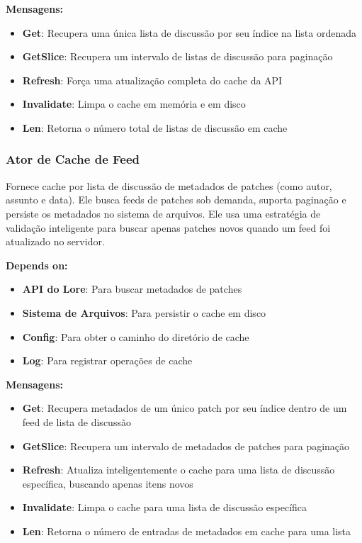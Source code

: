 \textbf{Mensagens:}

\begin{itemize}
    \item \textbf{Get}: Recupera uma única lista de discussão por seu índice na lista ordenada
    \item \textbf{GetSlice}: Recupera um intervalo de listas de discussão para paginação
    \item \textbf{Refresh}: Força uma atualização completa do cache da API
    \item \textbf{Invalidate}: Limpa o cache em memória e em disco
    \item \textbf{Len}: Retorna o número total de listas de discussão em cache
\end{itemize}

\subsubsection{Ator de Cache de Feed}

Fornece cache por lista de discussão de metadados de patches (como autor, assunto e data). Ele busca feeds de patches sob demanda, suporta paginação e persiste os metadados no sistema de arquivos. Ele usa uma estratégia de validação inteligente para buscar apenas patches novos quando um feed foi atualizado no servidor.

\textbf{Depends on:}

\begin{itemize}
    \item \textbf{API do Lore}: Para buscar metadados de patches
    \item \textbf{Sistema de Arquivos}: Para persistir o cache em disco
    \item \textbf{Config}: Para obter o caminho do diretório de cache
    \item \textbf{Log}: Para registrar operações de cache
\end{itemize}

\textbf{Mensagens:}

\begin{itemize}
    \item \textbf{Get}: Recupera metadados de um único patch por seu índice dentro de um feed de lista de discussão
    \item \textbf{GetSlice}: Recupera um intervalo de metadados de patches para paginação
    \item \textbf{Refresh}: Atualiza inteligentemente o cache para uma lista de discussão específica, buscando apenas itens novos
    \item \textbf{Invalidate}: Limpa o cache para uma lista de discussão específica
    \item \textbf{Len}: Retorna o número de entradas de metadados em cache para uma lista
\end{itemize}

